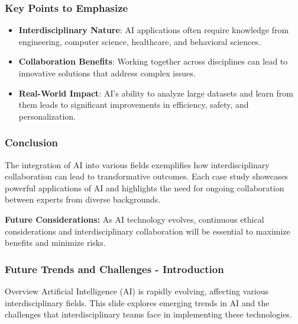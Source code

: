 \documentclass[aspectratio=169]{beamer}
\begin{document}
\begin{frame}[fragile]
    \frametitle{Key Points to Emphasize}
    \begin{itemize}
        \item \textbf{Interdisciplinary Nature}: AI applications often require knowledge from engineering, computer science, healthcare, and behavioral sciences.
        \item \textbf{Collaboration Benefits}: Working together across disciplines can lead to innovative solutions that address complex issues.
        \item \textbf{Real-World Impact}: AI’s ability to analyze large datasets and learn from them leads to significant improvements in efficiency, safety, and personalization.
    \end{itemize}
\end{frame}

\begin{frame}[fragile]
    \frametitle{Conclusion}
    The integration of AI into various fields exemplifies how interdisciplinary collaboration can lead to transformative outcomes. Each case study showcases powerful applications of AI and highlights the need for ongoing collaboration between experts from diverse backgrounds.

    \textbf{Future Considerations:} As AI technology evolves, continuous ethical considerations and interdisciplinary collaboration will be essential to maximize benefits and minimize risks.
\end{frame}

\begin{frame}[fragile]
    \frametitle{Future Trends and Challenges - Introduction}
    \begin{block}{Overview}
        Artificial Intelligence (AI) is rapidly evolving, affecting various interdisciplinary fields. This slide explores emerging trends in AI and the challenges that interdisciplinary teams face in implementing these technologies.
    \end{block}
\end{frame}
\end{document}
